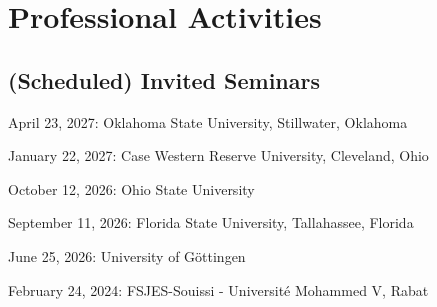 \documentclass[12pt,letterpaper]{article}
\renewenvironment{itemize}{
  \begin{list}{}{
    \setlength{\leftmargin}{1.5em}
  }
}{
  \end{list}
}
\begin{document}
\section*{Professional Activities}

\subsection*{(Scheduled) Invited Seminars}
\begin{itemize}
	\item April 23, 2027: Oklahoma State University, Stillwater, Oklahoma
	\item January 22, 2027: Case Western Reserve University, Cleveland, Ohio
	\item October 12, 2026: Ohio State University
	\item September 11, 2026: Florida State University, Tallahassee, Florida
	\item June 25, 2026: University of G\"ottingen
	\item February 24, 2024: FSJES-Souissi - Universit\'e Mohammed V, Rabat
\end{itemize}
\end{document}
